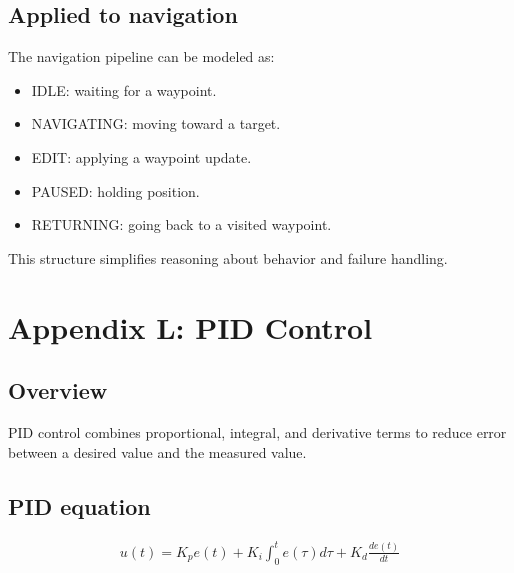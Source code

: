 \documentclass[letterpaper,10pt,english]{sphinxmanual}
\begin{document}
\section{Applied to navigation}
\label{\detokenize{appendix_k_state_machine:applied-to-navigation}}
\sphinxAtStartPar
The navigation pipeline can be modeled as:
\begin{itemize}
\item {} 
\sphinxAtStartPar
IDLE: waiting for a waypoint.

\item {} 
\sphinxAtStartPar
NAVIGATING: moving toward a target.

\item {} 
\sphinxAtStartPar
EDIT: applying a waypoint update.

\item {} 
\sphinxAtStartPar
PAUSED: holding position.

\item {} 
\sphinxAtStartPar
RETURNING: going back to a visited waypoint.

\end{itemize}

\sphinxAtStartPar
This structure simplifies reasoning about behavior and failure handling.


\chapter{Appendix L: PID Control}
\label{\detokenize{appendix_l_pid_control:appendix-l-pid-control}}\label{\detokenize{appendix_l_pid_control::doc}}

\section{Overview}
\label{\detokenize{appendix_l_pid_control:overview}}
\sphinxAtStartPar
PID control combines proportional, integral, and derivative terms to reduce
error between a desired value and the measured value.


\section{PID equation}
\label{\detokenize{appendix_l_pid_control:pid-equation}}\begin{equation*}
\begin{split}u(t) = K_p e(t) + K_i \int_0^t e(\tau) d\tau + K_d \frac{de(t)}{dt}\end{split}
\end{equation*}
\end{document}
